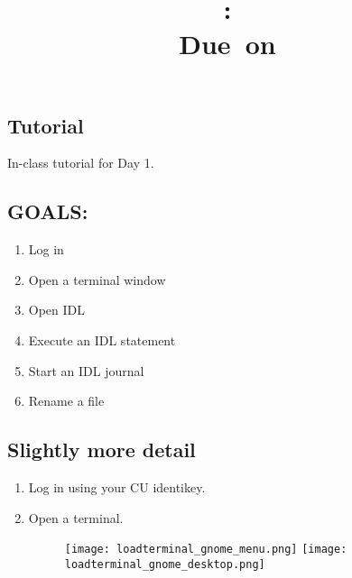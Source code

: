 \documentclass{article}
\title{\vspace{2in}\textmd{\textbf{\hmwkClass:\ \hmwkTitle}}\\\normalsize\vspace{0.1in}\small{Due\ on\ \hmwkDueDate}\\\vspace{0.1in}\large{}\vspace{3in}}
\date{}
\begin{document}
\begin{spacing}{1.0}
\newpage



\section{\textbf{Tutorial} }

In-class tutorial for Day 1.

\subsection{GOALS:}
\begin{enumerate}
    \item Log in 
    \item Open a terminal window
    \item Open IDL
    \item Execute an IDL statement
    \item Start an IDL journal
    \item Rename a file
\end{enumerate}

\par
\subsection{Slightly more detail}
\par
\begin{enumerate}
    \item Log in using your CU identikey.

    \item Open a terminal. 
\begin{figure}[htp]%
    \begin{center}
    \texttt{[image: loadterminal\_gnome\_menu.png]}
    \texttt{[image: loadterminal\_gnome\_desktop.png]}
    \end{center}
\end{figure}


\end{enumerate}
\end{spacing}
\end{document}

